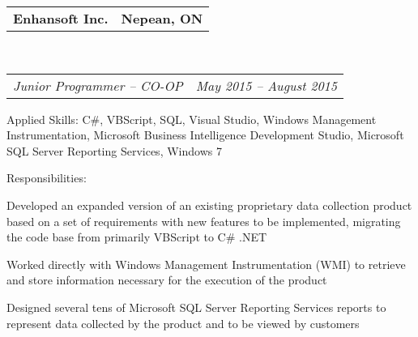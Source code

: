 \documentclass[10pt,letterpaper]{article}
\makeatletter
\newenvironment{indentsection}[1]%
{\begin{list}{}%
  {\setlength{\leftmargin}{#1}}%
  \item[]%
}
{\end{list}}
\newcommand{\headerrow}[2]
{\begin{tabular*}{\linewidth}{l@{\extracolsep{\fill}}r}
  #1 &
  #2 \\
\end{tabular*}}
\makeatother
\begin{document}
\begin{itemize}
  \item
  \headerrow
    {\textbf{Enhansoft Inc.}}
    {\textbf{Nepean, ON}}
  \\
  \headerrow
    {\emph{Junior Programmer -- CO-OP}}
    {\emph{May 2015 -- August 2015}}
  \begin{indentsection}{1em}
    \begin{description*}
      \item[Applied Skills:]
      C\#, VBScript, SQL, Visual Studio, Windows Management Instrumentation,
      Microsoft Business Intelligence Development Studio, Microsoft SQL Server
      Reporting Services, Windows 7
      \item[Responsibilities:]
      \hfill
      \begin{itemize*}
        \item Developed an expanded version of an existing proprietary data
        collection product based on a set of requirements with new features to be
        implemented, migrating the code base from primarily VBScript to C\# .NET
        \item Worked directly with Windows Management Instrumentation (WMI) to
        retrieve and store information necessary for the execution of the product
        \item Designed several tens of Microsoft SQL Server Reporting Services
        reports to represent data collected by the product and to be viewed by
        customers
      \end{itemize*}
    \end{description*}
  \end{indentsection}


\end{itemize}
\end{document}
